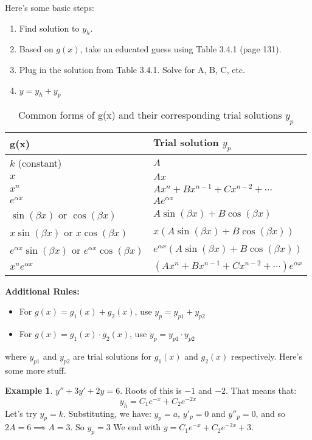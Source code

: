 \documentclass{article}
\theoremstyle{definition}
\newtheorem{example}{Example}[section]
\begin{document}
Here's some basic steps: 
\begin{enumerate}
    \item Find solution to $y_h$.
    \item Based on $g(x)$, take an educated guess using Table 3.4.1 (page 131).
    \item Plug in the solution from Table 3.4.1. Solve for A, B, C, etc. 
    \item $y = y_h + y_p$
\end{enumerate}

\begin{table}[h]
    \centering
    \begin{tabular}{|l|l|}
    \hline
    \textbf{g(x)} & \textbf{Trial solution $y_p$} \\
    \hline
    $k$ (constant) & $A$ \\
    $x$ & $Ax$ \\
    $x^n$ & $Ax^n + Bx^{n-1} + Cx^{n-2} + \cdots$ \\
    $e^{\alpha x}$ & $Ae^{\alpha x}$ \\
    $\sin(\beta x)$ or $\cos(\beta x)$ & $A\sin(\beta x) + B\cos(\beta x)$ \\
    $x\sin(\beta x)$ or $x\cos(\beta x)$ & $x(A\sin(\beta x) + B\cos(\beta x))$ \\
    $e^{\alpha x}\sin(\beta x)$ or $e^{\alpha x}\cos(\beta x)$ & $e^{\alpha x}(A\sin(\beta x) + B\cos(\beta x))$ \\
    $x^n e^{\alpha x}$ & $(Ax^n + Bx^{n-1} + Cx^{n-2} + \cdots)e^{\alpha x}$ \\
    \hline
    \end{tabular}
    \caption{Common forms of g(x) and their corresponding trial solutions $y_p$}
    \label{tab:trial_solutions}
    \end{table}
    
    \textbf{Additional Rules:}
    \begin{itemize}
        \item For $g(x) = g_1(x) + g_2(x)$, use $y_p = y_{p1} + y_{p2}$
        \item For $g(x) = g_1(x) \cdot g_2(x)$, use $y_p = y_{p1} \cdot y_{p2}$
    \end{itemize}
    where $y_{p1}$ and $y_{p2}$ are trial solutions for $g_1(x)$ and $g_2(x)$ respectively.
Here's some more stuff. 
\begin{example}
    $y'' + 3y' + 2y = 6$. Roots of this is $-1$ and $-2$. That means that: 
    \[ y_h = C_1 e^{-x} + C_2e^{-2x} \]
Let's try $y_p = k$. Substituting, we have: $y_p = a$, $y'_p = 0$ and $y''_p = 0$, and so $2A = 6 \implies A = 3$. So $y_p = 3$ We end with $y = C_1 e^{-x} + C_2e^{-2x} + 3$. 
\end{example}
\end{document}
